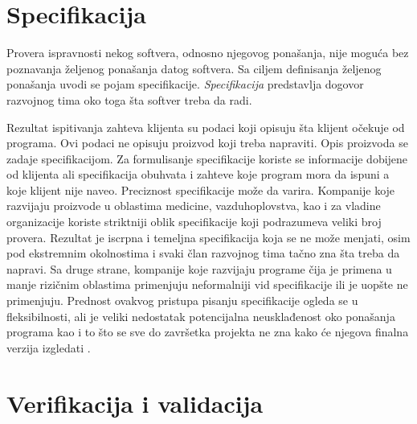 \documentclass[12pt,oneside]{memoir}
\begin{document}
\section{Specifikacija} \label{sec:specifikacija}

Provera ispravnosti nekog softvera, odnosno njegovog ponašanja, nije moguća bez poznavanja željenog ponašanja datog softvera. Sa ciljem definisanja željenog ponašanja uvodi se pojam specifikacije. \textit{Specifikacija} predstavlja dogovor razvojnog tima oko toga šta softver treba da radi. 

Rezultat ispitivanja zahteva klijenta su podaci koji opisuju šta klijent očekuje od programa. Ovi podaci ne opisuju proizvod koji treba napraviti. Opis proizvoda se zadaje specifikacijom. Za formulisanje specifikacije koriste se informacije dobijene od klijenta ali specifikacija obuhvata i zahteve koje program mora da ispuni a koje klijent nije naveo. Preciznost specifikacije može da varira. Kompanije koje razvijaju proizvode u oblastima medicine, vazduhoplovstva, kao i za vladine organizacije koriste striktniji oblik specifikacije koji podrazumeva veliki broj provera. Rezultat je iscrpna i temeljna specifikacija koja se ne može menjati, osim pod ekstremnim okolnostima i svaki član razvojnog tima tačno zna šta treba da napravi. Sa druge strane, kompanije koje razvijaju programe čija je primena u manje rizičnim oblastima primenjuju neformalniji vid specifikacije ili je uopšte ne primenjuju. Prednost ovakvog pristupa pisanju specifikacije ogleda se u fleksibilnosti, ali je veliki nedostatak potencijalna neusklađenost oko ponašanja programa kao i to što se sve do završetka projekta ne zna kako će njegova finalna verzija izgledati \cite{mvj, SoftTest}.


\section{Verifikacija i validacija} \label{sec:verval}
\end{document}
